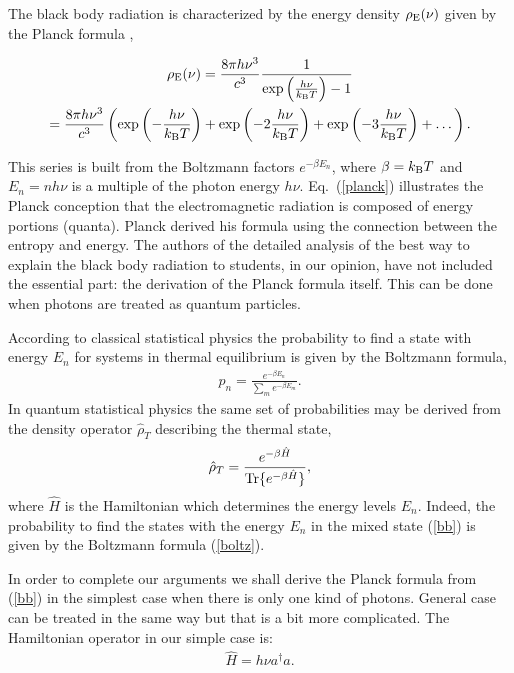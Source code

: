 \documentclass[onecolumn,aps,pra,12pt]{revtex4-1}
\begin{document}
The black body radiation is characterized by the energy density $\rho_{\rm E}(\nu)$ given by the Planck formula \cite{planck},
\begin{widetext}
\begin{multline}\label{planck}
\rho_{\rm E}(\nu)=\frac{8\pi h\nu^3}{c^3}
\frac{1}{\exp\left(\frac{h\nu}{k_{\rm B}T}\right)-1}
\\=\frac{8\pi h\nu^3}{c^3}\left(\exp\left(-\frac{h\nu}{k_{\rm B}T}\right)+\exp\left(-2\frac{h\nu}{k_{\rm B}T}\right)+\exp\left(-3\frac{h\nu}{k_{\rm B}T}\right)+\dots\right).
\end{multline}
\end{widetext}
This series is built from the Boltzmann factors $e^{-\beta E_n}$, where $\beta=k_{\rm B}T$ and $E_n=nh\nu$ is a multiple of the photon energy $h\nu$. Eq.~(\ref{planck}) illustrates the Planck conception that the electromagnetic radiation is composed of energy portions (quanta). Planck derived his formula using the connection between the entropy and energy. The authors of the detailed analysis \cite{mw} of the best way to explain the black body radiation to students, in our opinion, have not included the essential part: the derivation of the Planck formula itself. This can be done when photons are treated as quantum particles.

According to classical statistical physics the probability to find a state with energy $E_n$ for systems in thermal equilibrium is given \cite{reif} by the Boltzmann formula,
\begin{align}\label{boltz}
p_n=\frac{e^{-\beta E_n}}{\sum_{m}e^{-\beta E_m}}.
\end{align}
In quantum statistical physics the same set of probabilities may be derived from the density operator $\hat{\rho}_T$ describing the thermal state,
\begin{align}\label{bb}
\hat{\rho}_T=\frac{e^{-\beta\hat{H}}}{{\rm Tr}\{e^{-\beta\hat{H}}\}},
\end{align}
where $\hat{H}$ is the Hamiltonian which determines the energy levels $E_n$. Indeed, the probability to find the states with the energy $E_n$ in the mixed state (\ref{bb}) is given by the Boltzmann formula (\ref{boltz}).

In order to complete our arguments we shall derive the Planck formula from (\ref{bb}) in the simplest case when there is only one kind of photons. General case can be treated in the same way but that is a bit more complicated. The Hamiltonian operator in our simple case is:
\begin{align}\label{sham}
\hat{H}=h\nu a^\dagger a.
\end{align}
\end{document}
